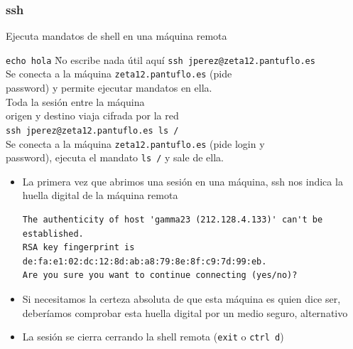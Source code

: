 \documentclass[ucs]{beamer}
\begin{document}

\begin{frame}[shrink=5,fragile]
\frametitle{ssh}
\vspace{1.5cm}
    Ejecuta mandatos de shell en una máquina remota
    \begin{footnotesize}
      \begin{tabbing}
        \verb|echo hola|\hspace{1cm} \= No escribe nada útil aquí\kill
        \verb|ssh jperez@zeta12.pantuflo.es|\\ \> Se conecta a la máquina
        \verb|zeta12.pantuflo.es| (pide \\\> password) y
        permite ejecutar mandatos en ella. \\\> 
        Toda la sesión entre la
        máquina\\\> origen y destino viaja cifrada por la red\\
        \verb|ssh jperez@zeta12.pantuflo.es ls /|\\ \> Se conecta a la máquina
        \verb|zeta12.pantuflo.es| (pide login y\\\> password), ejecuta el
        mandato \verb|ls /| y sale de ella.

      \end{tabbing}
    \end{footnotesize}

\end{frame}


\begin{frame}[fragile]
\begin{itemize}
\item
La primera vez que abrimos una sesión en una máquina, ssh nos indica la huella digital
de la máquina remota
  \begin{scriptsize}
  \begin{verbatim}
The authenticity of host 'gamma23 (212.128.4.133)' can't be established.
RSA key fingerprint is de:fa:e1:02:dc:12:8d:ab:a8:79:8e:8f:c9:7d:99:eb.
Are you sure you want to continue connecting (yes/no)?
  \end{verbatim}
  \end{scriptsize}

\item
Si necesitamos la certeza absoluta de que esta máquina es quien dice ser, deberíamos
comprobar esta huella digital por un medio seguro, alternativo

\item
La sesión se cierra cerrando la shell remota (\verb|exit| o \verb|ctrl d|)
\end{itemize}



\end{frame}
\end{document}
